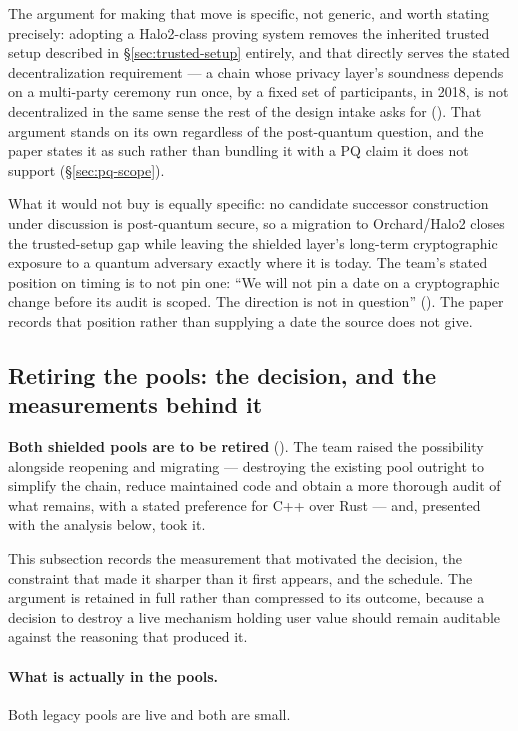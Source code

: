 The argument for making that move is specific, not generic, and worth stating precisely: adopting a
Halo2-class proving system removes the inherited trusted setup described in
\S\ref{sec:trusted-setup} entirely, and that directly serves the stated decentralization requirement
— a chain whose privacy layer's soundness depends on a multi-party ceremony run once, by a fixed set
of participants, in 2018, is not decentralized in the same sense the rest of the design intake asks
for  (\vision). That argument stands on its own regardless of the
post-quantum question, and the paper states it as such rather than bundling it with a PQ claim it
does not support (\S\ref{sec:pq-scope}).

What it would not buy is equally specific: no candidate successor construction under discussion is
post-quantum secure, so a migration to Orchard/Halo2 closes the trusted-setup gap while leaving the
shielded layer's long-term cryptographic exposure to a quantum adversary exactly where it is today.
The team's stated position on timing is to not pin one: ``We will not pin a date on a cryptographic
change before its audit is scoped. The direction is not in question''
 (\planned). The paper records that position rather than
supplying a date the source does not give.

\subsection{Retiring the pools: the decision, and the measurements behind it}
\label{sec:shielded-retirement}

\textbf{Both shielded pools are to be retired} 
(\planned). The team raised the possibility alongside reopening and migrating --- destroying the
existing pool outright to simplify the chain, reduce maintained code and obtain a more thorough audit
of what remains, with a stated preference for C++ over Rust
 --- and, presented with the analysis below, took it.

This subsection records the measurement that motivated the decision, the constraint that made it
sharper than it first appears, and the schedule. The argument is retained in full rather than
compressed to its outcome, because a decision to destroy a live mechanism holding user value should
remain auditable against the reasoning that produced it.

\paragraph{What is actually in the pools.} Both legacy pools are live and both are small.

